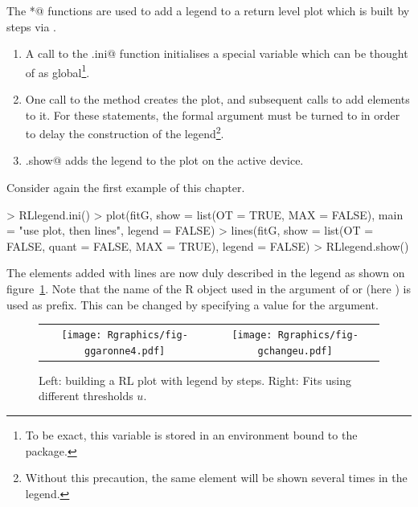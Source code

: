 \documentclass[a4paper]{report}
\begin{document}
The \verb@RLlegend*@ functions are used to add a legend to a return level
plot which is built by steps via \verb@lines@. 

\begin{enumerate}

\item A call to the \verb@RLlegend.ini@ function initialises a special variable
which can be thought of as global\footnote{To be exact, this variable is stored
  in an environment bound to the package.}.

\item One call to the \verb@plot@ method creates the plot, and subsequent calls
to \verb@lines@ add elements to it.  For these statements, the \verb@legend@
formal argument must be turned to \verb@FALSE@ in order to delay the
construction of the legend\footnote{Without this precaution, the same
element will be shown several times in the legend.}.

\item \verb@RLlegend.show@ adds the legend to the plot on the active device.

\end{enumerate}
Consider again the first example of this chapter.
\begin{Schunk}
\begin{Sinput}
> RLlegend.ini()
> plot(fitG, show = list(OT = TRUE, MAX = FALSE),
       main = "use plot, then lines", legend = FALSE)
> lines(fitG, show = list(OT = FALSE, quant = FALSE, MAX = TRUE), legend = FALSE)
> RLlegend.show()
\end{Sinput}
\end{Schunk}
\par\noindent
The elements added with lines are now duly described in the legend as shown on 
figure~\ref{GGaronne4}. Note that the name of the R object used in the 
\verb@x@ argument of \verb@plot@ or \verb@lines@ (here \verb@fitG@)
is used as prefix. This can be changed by specifying a value for 
the \verb@label@ argument.

\begin{figure}
   \centering
   \begin{tabular}{c c} 
     \texttt{[image: Rgraphics/fig-ggaronne4.pdf]} &
     \texttt{[image: Rgraphics/fig-gchangeu.pdf]} 
   \end{tabular}
   \caption{\label{GGaronne4} Left: building a RL plot with legend by steps. Right:
     Fits using different thresholds $u$. }
\end{figure}
\end{document}
